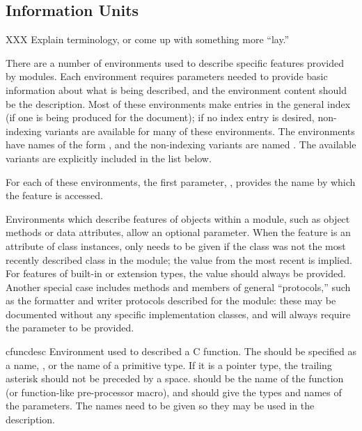 \documentclass{howto}
\begin{document}
  \subsection{Information Units \label{info-units}}

    XXX Explain terminology, or come up with something more ``lay.''

    There are a number of environments used to describe specific
    features provided by modules.  Each environment requires
    parameters needed to provide basic information about what is being
    described, and the environment content should be the description.
    Most of these environments make entries in the general index (if
    one is being produced for the document); if no index entry is
    desired, non-indexing variants are available for many of these
    environments.  The environments have names of the form
    , and the non-indexing variants are named
    .  The available variants are explicitly
    included in the list below.

    For each of these environments, the first parameter, ,
    provides the name by which the feature is accessed.

    Environments which describe features of objects within a module,
    such as object methods or data attributes, allow an optional
     parameter.  When the feature is an attribute of
    class instances,  only needs to be given if the
    class was not the most recently described class in the module; the
     value from the most recent  is implied.
    For features of built-in or extension types, the 
    value should always be provided.  Another special case includes
    methods and members of general ``protocols,'' such as the
    formatter and writer protocols described for the
     module: these may be documented without any
    specific implementation classes, and will always require the
     parameter to be provided.

    \begin{envdesc}{cfuncdesc}{}
      Environment used to described a C function.  The 
      should be specified as a  name, , or the name of a primitive type.  If it is a pointer
      type, the trailing asterisk should not be preceded by a space.
       should be the name of the function (or function-like
      pre-processor macro), and  should give the types and
      names of the parameters.  The names need to be given so they may
      be used in the description.
    \end{envdesc}
\end{document}
